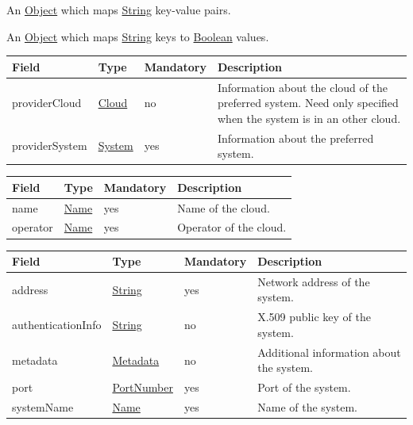 \documentclass[a4paper]{arrowhead}
\newcommand{\pref}[1]{{\textcolor{ArrowheadGrey}{\hyperref[sec:model:primitives:#1]{#1}}}}
\begin{document}
\label{sec:model:Metadata}

An \pref{Object} which maps \pref{String} key-value pairs.

\label{sec:model:OrchestrationFlags}

An \pref{Object} which maps \pref{String} keys to \pref{Boolean} values. 

\newpage

\label{sec:model:PreferredProvider}

\begin{table}[ht!]
\begin{tabularx}{\textwidth}{| p{4cm} | p{4cm} | p{2cm} | X |} \hline
\rowcolor{gray!33} Field & Type & Mandatory & Description \\ \hline

providerCloud &\hyperref[sec:model:Cloud]{Cloud} & no & Information about the cloud of the preferred system. Need only specified when the system is in an other cloud. \\ \hline
providerSystem &\hyperref[sec:model:System]{System} & yes & Information about the preferred system.  \\ \hline
\end{tabularx}
\end{table}

\label{sec:model:Cloud}

\begin{table}[ht!]
\begin{tabularx}{\textwidth}{| p{4cm} | p{4cm} | p{2cm} | X |} \hline
\rowcolor{gray!33} Field & Type & Mandatory & Description \\ \hline

name &\pref{Name} & yes & Name of the cloud. \\ \hline
operator &\pref{Name} & yes & Operator of the cloud. \\ \hline

\end{tabularx}
\end{table}

\label{sec:model:System}

\begin{table}[ht!]
\begin{tabularx}{\textwidth}{| p{4cm} | p{4cm} | p{2cm} | X |} \hline
\rowcolor{gray!33} Field & Type & Mandatory & Description \\ \hline

address &\pref{String} & yes & Network address of the system. \\ \hline
authenticationInfo &\pref{String} & no & X.509 public key of the system. \\ \hline
metadata &\hyperref[sec:model:Metadata]{Metadata} & no & Additional information about the system. \\ \hline
port &\pref{PortNumber} & yes & Port of the system. \\ \hline
systemName &\pref{Name} & yes & Name of the system. \\ \hline
\end{tabularx}
\end{table}
\end{document}

